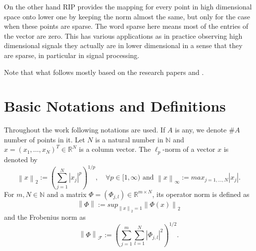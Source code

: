 \documentclass[twoside,11pt]{article}
\newcommand\norm[1]{\left\lVert#1\right\rVert}
\newcommand*\by{{\times}}
\begin{document}
On the other hand RIP provides the mapping for every point in high dimensional space onto lower one by keeping the norm almost the same, but only for the case when these points are sparse. The word sparse here means most of the entries of the vector are zero. This has various applications as in practice observing high dimensional signals they actually are in lower dimensional in a sense that they are sparse, in particular in signal processing. 


Note that what follows mostly based on the research papers \citep{isometry} and \citep{Khramer}. 


\section{Basic Notations and Definitions}
Throughout the work following notations are used. If $A$ is any, we denote $\#A$ number of points in it.  Let $N$ is a natural number in $\mathbb{N}$ and $x = (x_1, \dots, x_N)^T \in \mathbb{R}^N$ is a column vector. The $\ell_p$-norm of a vector $x$ is denoted by
$$
\norm{x}_2 := (\sum_{j=1}^{N}|x_j|^p)^{1/p}, \quad \forall p \in [1, \infty) \text{ and }
\norm{x}_{\infty} := max_{j=1, \dots, N}|x_j|. 
$$
For $m, N \in \mathbb{N}$ and a matrix $\Phi = (\Phi_{j,l}) \in \mathbb{R}^{m \by N}$, its operator norm is defined as 
$$
\norm{\Phi} := sup_{\norm{x}_2 = 1}\norm{\Phi(x)}_2
$$
and the Frobenius norm as 
$$
\norm{\Phi}_{\mathcal{F}} := (\sum_{j=1}^{m} \sum_{l=1}^{N} |\Phi_{j,l}|^2)^{1/2}.
$$
\end{document}

